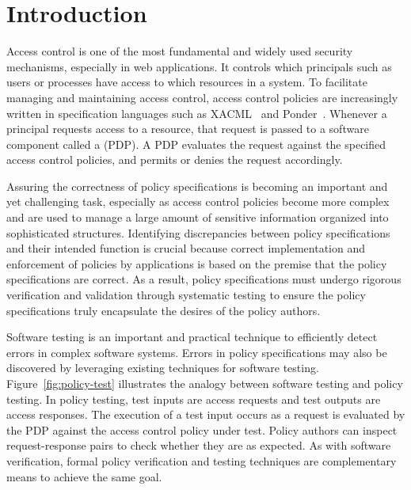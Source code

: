 \chapter{Introduction}


Access control is one of the most fundamental and widely used
security mechanisms, especially in web applications. It controls
which principals such as users or processes have access to which
resources in a system. To facilitate managing and maintaining access
control, access control policies are increasingly written in
specification languages such as XACML~\cite{oasis05:xacml} and
Ponder~\cite{damianou01:ponder}. Whenever a principal requests
access to a resource, that request is passed to a software component
called a  (PDP). A PDP evaluates the
request against the specified access control policies, and permits
or denies the request accordingly.

Assuring the correctness of policy specifications is becoming an
important and yet challenging task, especially as access control
policies become more complex and are used to manage a large amount
of sensitive information organized into sophisticated structures.
Identifying discrepancies between policy specifications and their
intended function is crucial because correct implementation and
enforcement of policies by applications is based on the premise
that the policy specifications are correct. As a result, policy
specifications must undergo rigorous verification and validation
through systematic testing to ensure the policy specifications
truly encapsulate the desires of the policy authors.

Software testing is an important and practical technique to
efficiently detect errors in complex software systems. Errors in
policy specifications may also be discovered by leveraging existing
techniques for software testing. Figure~\ref{fig:policy-test}
illustrates the analogy between software testing and policy testing.
In policy testing, test inputs are access requests and test outputs
are access responses. The execution of a test input occurs as a
request is evaluated by the PDP against the access control policy
under test. Policy authors can inspect request-response pairs to
check whether they are as expected. As with software verification,
formal policy verification and testing techniques are complementary
means to achieve the same goal.


